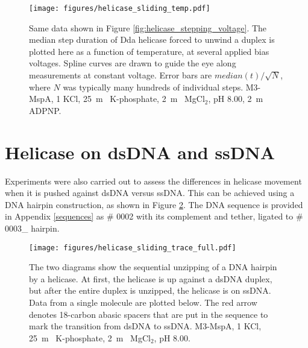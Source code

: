 \begin{figure}[h]
\begin{centering}
\texttt{[image: figures/helicase\_sliding\_temp.pdf]}
\caption[Forced helicase stepping depends on temperature]{Same data shown in Figure \ref{fig:helicase_stepping_voltage}.  The median step duration of Dda helicase forced to unwind a duplex is plotted here as a function of temperature, at several applied bias voltages.  Spline curves are drawn to guide the eye along measurements at constant voltage.  Error bars are $median(t)/\sqrt{N}$, where $N$ was typically many hundreds of individual steps.  M3-MspA, \SI{1}{\Molar} KCl, \SI{25}{\m\Molar} K-phosphate, \SI{2}{\m\Molar} MgCl$_2$, pH \num{8.00}, \SI{2}{\m\Molar} ADPNP.}
\label{fig:helicase_stepping_temp}
\end{centering}
\end{figure}


\section{Helicase on dsDNA and ssDNA}

Experiments were also carried out to assess the differences in helicase movement when it is pushed against dsDNA versus ssDNA.  This can be achieved using a DNA hairpin construction, as shown in Figure \ref{fig:helicase_stepping_full_ss_ds}.  The DNA sequence is provided in Appendix \ref{sequences} as \# 0002 with its complement and tether, ligated to \# 0003\_ hairpin.

\begin{figure}[h]
\begin{centering}
\texttt{[image: figures/helicase\_sliding\_trace\_full.pdf]}
\caption[Forced helicase stepping depends on unzipping]{The two diagrams show the sequential unzipping of a DNA hairpin by a helicase.  At first, the helicase is up against a dsDNA duplex, but after the entire duplex is unzipped, the helicase is on ssDNA.  Data from a single molecule are plotted below.  The red arrow denotes 18-carbon abasic spacers that are put in the sequence to mark the transition from dsDNA to ssDNA.  M3-MspA, \SI{1}{\Molar} KCl, \SI{25}{\m\Molar} K-phosphate, \SI{2}{\m\Molar} MgCl$_2$, pH \num{8.00}.}
\label{fig:helicase_stepping_full_ss_ds}
\end{centering}
\end{figure}

